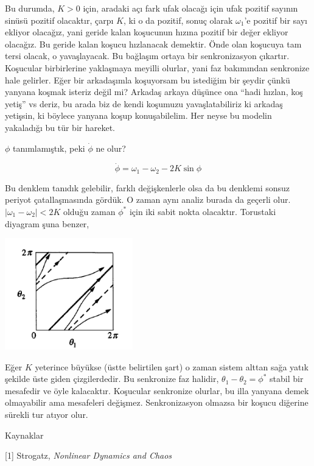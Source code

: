 \documentclass[12pt,fleqn]{article}\usepackage{../../common}
\begin{document}
Bu durumda, $K > 0$ için, aradaki açı fark ufak olacağı için ufak pozitif
sayının sinüsü pozitif olacaktır, çarpı $K$, ki o da pozitif, sonuç olarak
$\omega_1$'e pozitif bir sayı ekliyor olacağız, yani geride kalan koşucunun
hızına pozitif bir değer ekliyor olacağız. Bu geride kalan koşucu
hızlanacak demektir. Önde olan koşucuya tam tersi olacak, o
yavaşlayacak. Bu bağlaşım ortaya bir senkronizasyon çıkartır. Koşucular
birbirlerine yaklaşmaya meyilli olurlar, yani faz bakımından senkronize
hale gelirler. Eğer bir arkadaşımla koşuyorsam bu istediğim bir şeydir
çünkü yanyana koşmak isteriz değil mi? Arkadaş arkaya düşünce ona ``hadi
hızlan, koş yetiş'' vs deriz, bu arada biz de kendi koşumuzu
yavaşlatabiliriz ki arkadaş yetişsin, ki böylece yanyana koşup
konuşabilelim. Her neyse bu modelin yakaladığı bu tür bir hareket. 

$\phi$ tanımlamıştık, peki $\dot{\phi}$ ne olur? 

$$ 
\dot{\phi} = \omega_1 - \omega_2 - 2K \sin\phi
$$

Bu denklem tanıdık gelebilir, farklı değişkenlerle olsa da bu denklemi
sonsuz periyot çatallaşmasında gördük. O zaman aynı analiz burada da
geçerli olur. $|\omega_1-\omega_2| < 2K$ olduğu zaman $\phi^*$ için iki
sabit nokta olacaktır. Torustaki diyagram şuna benzer, 

\includegraphics[width=15em]{14_27.png}

Eğer $K$ yeterince büyükse (üstte belirtilen şart) o zaman sistem alttan
sağa yatık şekilde üste giden çizgilerdedir. Bu senkronize faz halidir,
$\theta_1-\theta_2 = \phi^*$ stabil bir mesafedir ve öyle
kalacaktır. Koşucular senkronize olurlar, bu illa yanyana demek olmayabilir
ama mesafeleri değişmez. Senkronizasyon olmazsa bir koşucu diğerine sürekli
tur atıyor olur.

Kaynaklar

[1] Strogatz, {\em Nonlinear Dynamics and Chaos}
\end{document}
